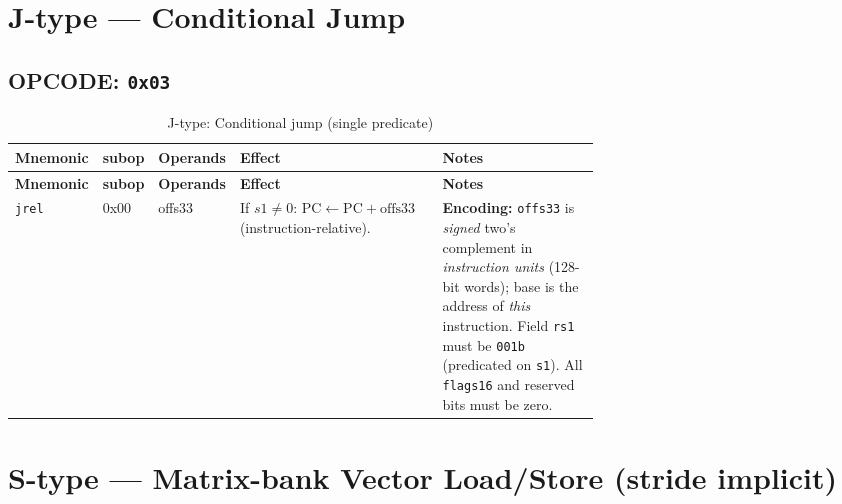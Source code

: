 \documentclass[10pt]{article}
\begin{document}
\section*{J-type — Conditional Jump}
\subsection*{OPCODE: \texttt{0x03}}
\begin{longtable}{@{}l l l L{0.38\linewidth} L{0.30\linewidth}@{}}
\caption{J-type: Conditional jump (single predicate)}\label{tab:jtype}\\
\toprule
\textbf{Mnemonic} & \textbf{subop} & \textbf{Operands} & \textbf{Effect} & \textbf{Notes} \\
\midrule
\endfirsthead
\toprule
\textbf{Mnemonic} & \textbf{subop} & \textbf{Operands} & \textbf{Effect} & \textbf{Notes} \\
\midrule
\endhead
\texttt{jrel} & 0x00 & offs33 &
If $s1 \neq 0$: $\mathrm{PC} \leftarrow \mathrm{PC} + \text{offs33}$ (instruction-relative). &
\textbf{Encoding:} \texttt{offs33} is \emph{signed} two’s complement in \emph{instruction units} (128-bit words); base is the address of \emph{this} instruction. Field \texttt{rs1} must be \texttt{001b} (predicated on \texttt{s1}). All \texttt{flags16} and reserved bits must be zero. \\
\bottomrule
\end{longtable}

\section*{S-type — Matrix-bank Vector Load/Store (stride implicit)}
\end{document}
